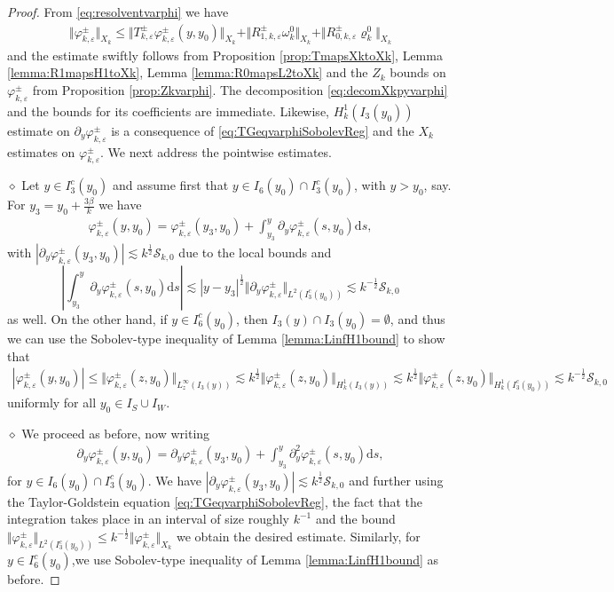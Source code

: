 \documentclass[11pt,reqno]{amsproc}
\newcommand{\diampar}[1]{\vspace{.5em}\noindent $\diamond$ \normalfont {\itshape #1.}}
\theoremstyle{definition}
\numberwithin{equation}{section}
\newcommand{\cS}{{\mathcal S}}
\renewcommand{\d}{\mathrm{d}}
\newcommand{\ep}{\varepsilon}
\begin{document}
\begin{proof}
From \eqref{eq:resolventvarphi} we have
\begin{align*}
\Vert \varphi_{k,\ep}^\pm \Vert_{X_k} \leq \Vert T_{k,\ep}^\pm \varphi_{k,\ep}^\pm (y,y_0) \Vert_{X_k} + \Vert R_{1,k,\ep}^\pm\omega_k^0\Vert_{X_k} + \Vert R_{0,k,\ep}^\pm  \varrho_k^0 \Vert_{X_k}
\end{align*}
and the estimate swiftly follows from Proposition \ref{prop:TmapsXktoXk}, Lemma \ref{lemma:R1mapsH1toXk}, Lemma \ref{lemma:R0mapsL2toXk} and the $Z_k$ bounds on $\varphi_{k,\ep}^\pm$ from Proposition \ref{prop:Zkvarphi}. The decomposition \eqref{eq:decomXkpyvarphi} and the bounds for its coefficients are immediate. Likewise, $H^1_k(I_3(y_0))$ estimate on $\partial_y\varphi_{k,\ep}^\pm$ is a consequence of \eqref{eq:TGeqvarphiSobolevReg} and the $X_k$ estimates on $\varphi_{k,\ep}^\pm$. We next address the pointwise estimates. 

\diampar{Proof for $n = 0$}
Let $y\in I_3^c(y_0)$ and assume first that $y\in I_6(y_0)\cap I_3^c(y_0)$, with $y > y_0$, say. For $y_3 = y_0 + \frac{3\beta}{k}$ we have 
\begin{align*}
\varphi_{k,\ep}^\pm (y,y_0) = \varphi_{k,\ep}^\pm(y_3,y_0) + \int_{y_3}^y \partial_y\varphi_{k,\ep}^\pm(s, y_0) \d s,
\end{align*} 
with $| \partial_y\varphi_{k,\ep}^\pm(y_3,y_0) | \lesssim k^{\frac12}\cS_{k,0}$ due to the local bounds and 
$$\left| \int_{y_3}^y \partial_y\varphi_{k,\ep}^\pm(s, y_0) \d s \right| \lesssim |y-y_3|^\frac12 \Vert \partial_y\varphi_{k,\ep}^\pm \Vert_{L^2(I_3^c(y_0))} \lesssim k^{-\frac12}\cS_{k,0}$$
as well. On the other hand, if $y\in I_6^c{(y_0)}$, then $I_3(y)\cap I_3(y_0)= \emptyset$, and thus we can use the Sobolev-type inequality of Lemma \ref{lemma:LinfH1bound} to show that
\begin{align*}
|\varphi_{k,\ep}^\pm(y,y_0)| \leq \Vert \varphi_{k,\ep}^\pm(z,y_0) \Vert_{L^\infty_z(I_3(y))} \lesssim k^\frac12 \Vert \varphi_{k,\ep}^\pm(z,y_0) \Vert_{H_k^1(I_3(y))} \lesssim k^\frac12\Vert \varphi_{k,\ep}^\pm(z,y_0) \Vert_{H_k^1(I_3^c(y_0))} \lesssim k^{-\frac12}\cS_{k,0}
\end{align*}
uniformly for all $y_0\in I_S\cup I_W$.

\diampar{Proof for $n=1$} We proceed as before, now writing
\begin{align*}
\partial_y\varphi_{k,\ep}^\pm (y,y_0) = \partial_y\varphi_{k,\ep}^\pm(y_3,y_0) + \int_{y_3}^y \partial_y^2\varphi_{k,\ep}^\pm(s, y_0) \d s,
\end{align*} 
for $y\in I_6(y_0) \cap I_3^c(y_0)$. We have $| \partial_y\varphi_{k,\ep}^\pm(y_3,y_0) | \lesssim k^{\frac12}\cS_{k,0}$ and further using the Taylor-Goldstein equation \eqref{eq:TGeqvarphiSobolevReg}, the fact that the integration takes place in an interval of size roughly $k^{-1}$ and the bound $\Vert \varphi_{k,\ep}^\pm\Vert_{L^2(I_3^c(y_0))} \leq k^{-\frac12}\Vert \varphi_{k,\ep}^\pm\Vert_{X_k}$ we obtain the desired estimate. Similarly, for $y\in I_6^c{(y_0)}$,we use Sobolev-type inequality of Lemma \ref{lemma:LinfH1bound} as before.


\end{proof}
\end{document}
